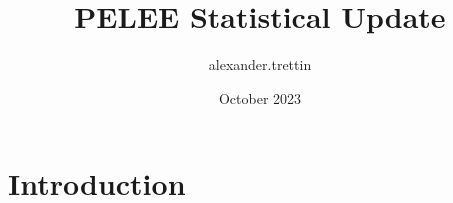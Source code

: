 \documentclass{article}
\title{PELEE Statistical Update}
\author{alexander.trettin }
\date{October 2023}
\begin{document}
\maketitle

\section{Introduction}
\end{document}
